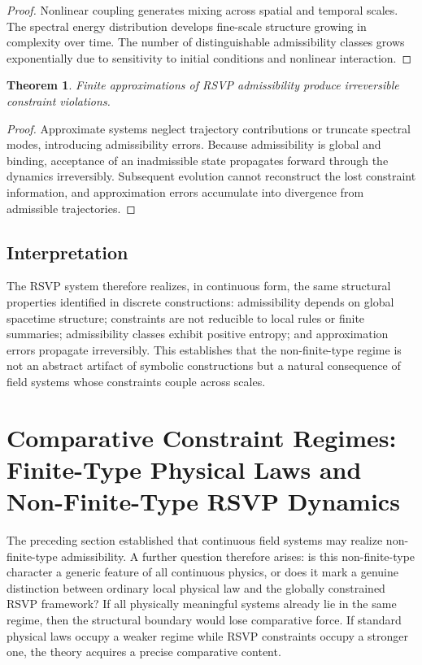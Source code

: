 \documentclass[12pt, a4paper]{article}
\theoremstyle{plain}
\newtheorem{theorem}{Theorem}[section]
\theoremstyle{definition}
\theoremstyle{remark}
\begin{document}
\begin{proof}
Nonlinear coupling generates mixing across spatial and temporal scales. The spectral energy distribution develops fine-scale structure growing in complexity over time. The number of distinguishable admissibility classes grows exponentially due to sensitivity to initial conditions and nonlinear interaction.
\end{proof}

\begin{theorem}
Finite approximations of RSVP admissibility produce irreversible constraint violations.
\end{theorem}

\begin{proof}
Approximate systems neglect trajectory contributions or truncate spectral modes, introducing admissibility errors. Because admissibility is global and binding, acceptance of an inadmissible state propagates forward through the dynamics irreversibly. Subsequent evolution cannot reconstruct the lost constraint information, and approximation errors accumulate into divergence from admissible trajectories.
\end{proof}

\subsection{Interpretation}

The RSVP system therefore realizes, in continuous form, the same structural properties identified in discrete constructions: admissibility depends on global spacetime structure; constraints are not reducible to local rules or finite summaries; admissibility classes exhibit positive entropy; and approximation errors propagate irreversibly. This establishes that the non-finite-type regime is not an abstract artifact of symbolic constructions but a natural consequence of field systems whose constraints couple across scales.

\section{Comparative Constraint Regimes: Finite-Type Physical Laws and Non-Finite-Type RSVP Dynamics}

The preceding section established that continuous field systems may realize non-finite-type admissibility. A further question therefore arises: is this non-finite-type character a generic feature of all continuous physics, or does it mark a genuine distinction between ordinary local physical law and the globally constrained RSVP framework? If all physically meaningful systems already lie in the same regime, then the structural boundary would lose comparative force. If standard physical laws occupy a weaker regime while RSVP constraints occupy a stronger one, the theory acquires a precise comparative content.
\end{document}
